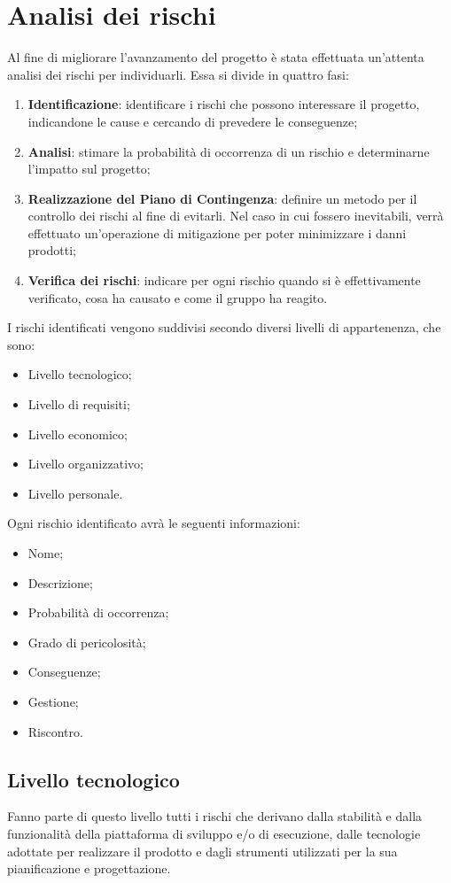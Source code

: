 \documentclass[../PianoDiProgetto.tex]{subfiles}
\begin{document}
\section{Analisi dei rischi}
Al fine di migliorare l’avanzamento del progetto è stata effettuata un’attenta analisi dei rischi per individuarli. Essa si divide in quattro fasi:

\begin{enumerate}
	\item \textbf{Identificazione}: identificare i rischi che possono interessare il progetto, indicandone le cause e cercando di prevedere le conseguenze;
	\item \textbf{Analisi}: stimare la probabilità di occorrenza di un rischio e determinarne l’impatto sul progetto;
	\item \textbf{Realizzazione del Piano di Contingenza}: definire un metodo per il controllo dei rischi al fine di evitarli. Nel caso in cui fossero inevitabili, verrà effettuato un'operazione di mitigazione per poter minimizzare i danni prodotti;
	\item \textbf{Verifica dei rischi}: indicare per ogni rischio quando si è effettivamente verificato, cosa ha causato e come il gruppo ha reagito.
\end{enumerate}
I rischi identificati vengono suddivisi secondo diversi livelli di appartenenza, che sono:
\begin{itemize}
	\item Livello tecnologico;
	\item Livello di requisiti;
	\item Livello economico;
	\item Livello organizzativo;
	\item Livello personale.
\end{itemize}
Ogni rischio identificato avrà le seguenti informazioni:
\begin{itemize}
	\item Nome;
	\item Descrizione;
	\item Probabilità di occorrenza;
	\item Grado di pericolosità;
	\item Conseguenze;
	\item Gestione;
	\item Riscontro.
\end{itemize}
	
	\subsection{Livello tecnologico}	
	Fanno parte di questo livello tutti i rischi che derivano dalla stabilità e dalla funzionalità della piattaforma di sviluppo e/o di esecuzione, dalle tecnologie adottate per realizzare il prodotto e dagli strumenti utilizzati per la sua pianificazione e progettazione.
	
\end{document}
